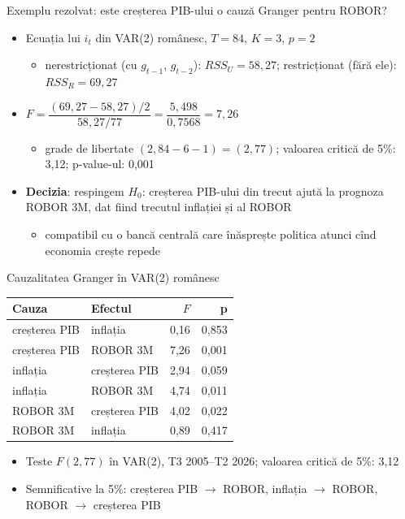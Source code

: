 \begin{frame}{Exemplu rezolvat: este creșterea PIB-ului o cauză Granger pentru ROBOR?}
\itemsize{\small}
\begin{itemize}
    \item Ecuația lui $i_t$ din VAR(2) românesc, $T = 84$, $K = 3$, $p = 2$
    \begin{itemize}
        \item nerestricționat (cu $g_{t-1}$, $g_{t-2}$): $RSS_U = 58{,}27$; restricționat (fără ele): $RSS_R = 69{,}27$
    \end{itemize}
    \item $F = \dfrac{(69{,}27 - 58{,}27)/2}{58{,}27/77} = \dfrac{5{,}498}{0{,}7568} = 7{,}26$
    \begin{itemize}
        \item grade de libertate $(2, 84 - 6 - 1) = (2, 77)$; valoarea critică de 5\%: 3{,}12; p-value-ul: 0{,}001
    \end{itemize}
    \item \textbf{Decizia}: respingem $H_0$: creșterea PIB-ului din trecut ajută la prognoza ROBOR 3M, dat fiind trecutul inflației și al ROBOR
    \begin{itemize}
        \item compatibil cu o bancă centrală care înăsprește politica atunci cînd economia crește repede
    \end{itemize}
\end{itemize}
\end{frame}

\begin{frame}{Cauzalitatea Granger în VAR(2) românesc}
\itemsize{\small}
\begin{center}
\footnotesize
\begin{tabular}{llrr}
\toprule
\textbf{Cauza} & \textbf{Efectul} & $F$ & \textbf{p} \\
\midrule
creșterea PIB & inflația & 0{,}16 & 0{,}853 \\
creșterea PIB & ROBOR 3M & 7{,}26 & 0{,}001 \\
inflația & creșterea PIB & 2{,}94 & 0{,}059 \\
inflația & ROBOR 3M & 4{,}74 & 0{,}011 \\
ROBOR 3M & creșterea PIB & 4{,}02 & 0{,}022 \\
ROBOR 3M & inflația & 0{,}89 & 0{,}417 \\
\bottomrule
\end{tabular}
\end{center}
\begin{itemize}
    \item Teste $F(2, 77)$ în VAR(2), T3 2005--T2 2026; valoarea critică de 5\%: 3{,}12
    \item Semnificative la 5\%: creșterea PIB $\to$ ROBOR, inflația $\to$ ROBOR, ROBOR $\to$ creșterea PIB
\end{itemize}
\end{frame}

